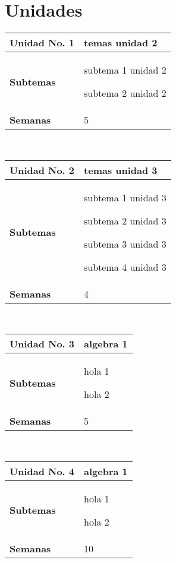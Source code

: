 \documentclass[11pt]{article}
\begin{document}
\section*{Unidades}
\noindent 
\begin{tabular}{R{0.16\textwidth} L{0.7\textwidth}} 
 \\ 
\toprule \textbf{Unidad No. 1} & temas unidad 2 
 \\ 
\midrule\textbf{Subtemas} & 
\begin{description}
 \item subtema 1 unidad 2 \item subtema 2 unidad 2 
\end{description}
 \\ 
\textbf{Semanas} & 5 
\end{tabular} 
 \\ 
 \begin{tabular}{R{0.16\textwidth} L{0.7\textwidth}} 
 \\ 
\toprule \textbf{Unidad No. 2} & temas unidad 3 
 \\ 
\midrule\textbf{Subtemas} & 
\begin{description}
 \item subtema 1 unidad 3 \item subtema 2 unidad 3 \item subtema 3 unidad 3 \item subtema 4 unidad 3 
\end{description}
 \\ 
\textbf{Semanas} & 4 
\end{tabular} 
 \\ 
 \begin{tabular}{R{0.16\textwidth} L{0.7\textwidth}} 
 \\ 
\toprule \textbf{Unidad No. 3} & algebra 1 
 \\ 
\midrule\textbf{Subtemas} & 
\begin{description}
 \item hola 1 \item hola 2 
\end{description}
 \\ 
\textbf{Semanas} & 5 
\end{tabular} 
 \\ 
 \begin{tabular}{R{0.16\textwidth} L{0.7\textwidth}} 
 \\ 
\toprule \textbf{Unidad No. 4} & algebra 1 
 \\ 
\midrule\textbf{Subtemas} & 
\begin{description}
 \item hola 1 \item hola 2 
\end{description}
 \\ 
\textbf{Semanas} & 10 
\end{tabular} 
 \\ 
 
\end{document}
